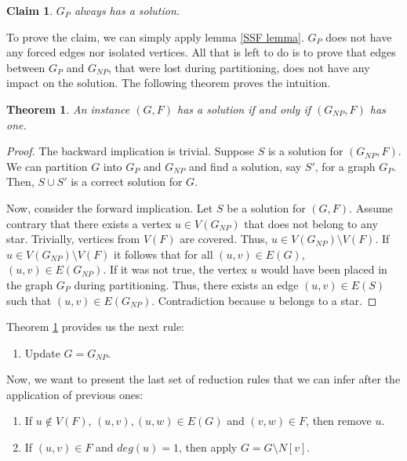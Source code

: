 \documentclass[en]{pracamgr}
\newtheorem{theorem}{Theorem}
\newtheorem{claim}{Claim}
\begin{document}
\begin{claim}\label{gp cut}
	$G_P$ always has a solution.
\end{claim}

To prove the claim, we can simply apply lemma \ref{SSF lemma}. $G_P$ does not have any forced edges nor isolated vertices. All that is left to do is to prove that edges between $G_P$ and $G_{NP}$, that were lost during partitioning, does not have any impact on the solution. The following theorem proves the intuition.

\begin{theorem}\label{GNP partition}
	An instance $(G,F)$ has a solution if and only if $(G_{NP},F)$ has one.
\end{theorem}

\begin{proof}
	The backward implication is trivial. Suppose $S$ is a solution for $(G_{NP},F)$. We can partition $G$ into $G_P$ and $G_{NP}$ and find a solution, say $S'$, for a graph $G_P$. Then, $S \cup S'$ is a correct solution for $G$.
	
	Now, consider the forward implication. Let $S$ be a solution for $(G, F)$. Assume contrary that there exists a vertex $u \in V(G_{NP})$ that does not belong to any star. Trivially, vertices from $V(F)$ are covered. Thus, $u \in V(G_{NP}) \setminus V(F)$. If $u \in V(G_{NP}) \setminus V(F)$ it follows that for all $(u,v) \in E(G)$, $(u,v) \in E(G_{NP})$. If it was not true, the vertex $u$ would have been placed in the graph $G_P$ during partitioning. Thus, there exists an edge $(u,v) \in E(S)$ such that $(u,v) \in E(G_{NP})$. Contradiction because $u$ belongs to a star.
	
\end{proof}

Theorem \ref{GNP partition} provides us the next rule:

\begin{enumerate}[leftmargin=*,label=\textbf{Reduction \arabic{enumi}},resume]
	\item Update $G = G_{NP}$.
\end{enumerate}

Now, we want to present the last set of reduction rules that we can infer after the application of previous ones:

\begin{enumerate}[leftmargin=*,label=\textbf{Reduction \arabic{enumi}},resume]
	\item If $u \notin V(F)$, $(u,v),(u,w) \in E(G)$ and $(v,w) \in F$, then remove $u$.
	\item If $(u,v) \in F$ and $deg(u)=1$, then apply $G = G \setminus N[v]$.
\end{enumerate}
\end{document}
